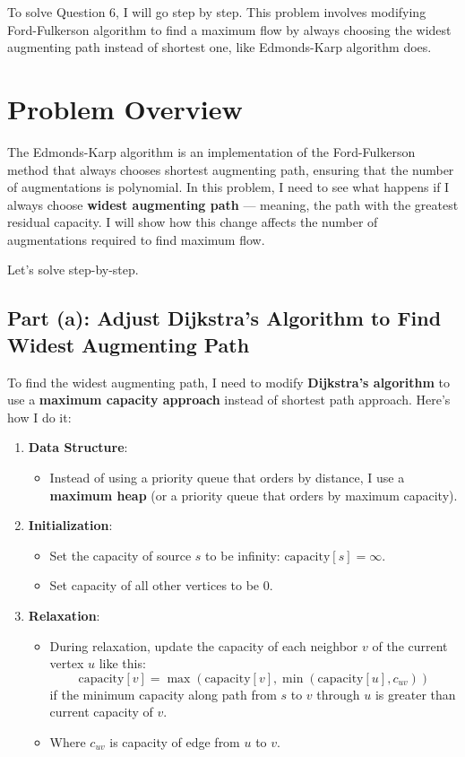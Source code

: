 \documentclass[10pt,letter,notitlepage]{article}
\begin{document}
\begin{Answer}
	
To solve Question 6, I will go step by step. This problem involves modifying Ford-Fulkerson algorithm to find a maximum flow by always choosing the widest augmenting path instead of shortest one, like Edmonds-Karp algorithm does.

\section*{Problem Overview}
The Edmonds-Karp algorithm is an implementation of the Ford-Fulkerson method that always chooses shortest augmenting path, ensuring that the number of augmentations is polynomial. In this problem, I need to see what happens if I always choose \textbf{widest augmenting path} — meaning, the path with the greatest residual capacity. I will show how this change affects the number of augmentations required to find maximum flow.

Let's solve step-by-step.

\subsection*{Part (a): Adjust Dijkstra’s Algorithm to Find Widest Augmenting Path}
To find the widest augmenting path, I need to modify \textbf{Dijkstra’s algorithm} to use a \textbf{maximum capacity approach} instead of shortest path approach. Here’s how I do it:

\begin{enumerate}
    \item \textbf{Data Structure}:
    \begin{itemize}
        \item Instead of using a priority queue that orders by distance, I use a \textbf{maximum heap} (or a priority queue that orders by maximum capacity).
    \end{itemize}

    \item \textbf{Initialization}:
    \begin{itemize}
        \item Set the capacity of source $s$ to be infinity: $\text{capacity}[s] = \infty$.
        \item Set capacity of all other vertices to be 0.
    \end{itemize}

    \item \textbf{Relaxation}:
    \begin{itemize}
        \item During relaxation, update the capacity of each neighbor $v$ of the current vertex $u$ like this:
        \[
        \text{capacity}[v] = \max(\text{capacity}[v], \min(\text{capacity}[u], c_{uv}))
        \]
        if the minimum capacity along path from $s$ to $v$ through $u$ is greater than current capacity of $v$.
        \item Where $c_{uv}$ is capacity of edge from $u$ to $v$.
    \end{itemize}
\end{enumerate}


\end{Answer}
\end{document}
